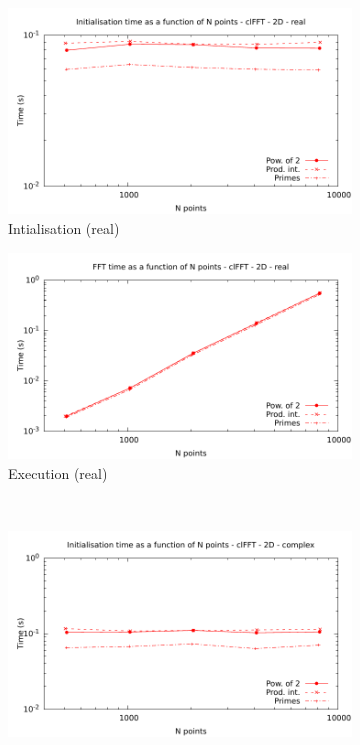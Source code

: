 \documentclass[12pt, a4paper]{article}
\begin{document}
\begin{figure}[H]
\captionsetup{width=0.8\linewidth}
\centering
\begin{subfigure}{.5\textwidth}
\centering
\includegraphics[width=.9\linewidth]{graphs/fft-opencl-2d-pow2-r-init.pdf}
\caption{Intialisation (real)}
\label{FFTCL2DRI}
\end{subfigure}%
\begin{subfigure}{.5\textwidth}
\centering
\includegraphics[width=.9\linewidth]{graphs/fft-opencl-2d-pow2-r-exec.pdf}
\caption{Execution (real)}
\label{FFTCL2DRE}
\end{subfigure}\\
\begin{subfigure}{.5\textwidth}
\centering
\includegraphics[width=.9\linewidth]{graphs/fft-opencl-2d-pow2-c-init.pdf}

\end{subfigure}
\end{figure}
\end{document}
